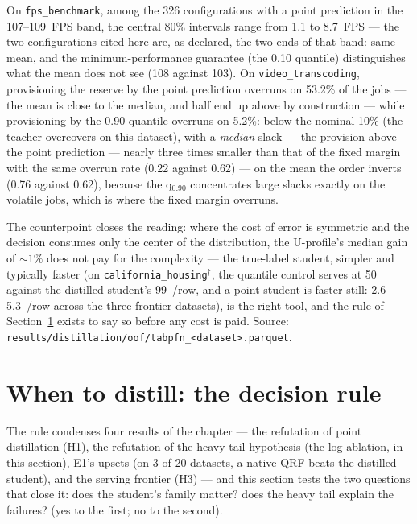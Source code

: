 On \texttt{fps\_\allowbreak benchmark}, among the 326 configurations
with a point prediction in the 107--109~FPS band, the central 80\%
intervals range from 1.1 to 8.7~FPS --- the two configurations cited here are,
as declared, the two ends of that band: same mean, and the
minimum-performance guarantee (the 0.10 quantile) distinguishes what
the mean does not see (108 against 103). On
\texttt{video\_\allowbreak transcoding}, provisioning the reserve by
the point prediction overruns on 53.2\% of the jobs --- the mean is
close to the median, and half end up above by construction ---
while provisioning by the 0.90 quantile overruns on 5.2\%: below
the nominal 10\% (the teacher overcovers on this dataset), with a
\emph{median} slack --- the provision above the point prediction ---
nearly three times smaller than that of the
fixed margin with the same overrun rate (0.22 against 0.62) --- on
the
mean the order inverts (0.76 against 0.62), because the q$_{0.90}$
concentrates large slacks exactly on the volatile jobs, which is
where the fixed margin overruns.

The counterpoint closes the reading: where the cost of error is
symmetric and the decision consumes only the center of the
distribution, the U-profile's median gain of ${\sim}1\%$ does not
pay for the complexity --- the true-label student, simpler and
typically faster (on
\texttt{california\_\allowbreak housing}$^\dagger$, the quantile
control serves at 50 against the distilled student's 99~\us/row,
and a point student is faster still: 2.6--5.3~\us/row across the
three frontier datasets), is the
right tool, and the rule of
Section~\ref{sec:destil-regra} exists to say so before any cost is
paid. Source:
\texttt{results/\allowbreak distillation/\allowbreak oof/\allowbreak tabpfn\_\allowbreak <dataset>.parquet}.

\section{When to distill: the decision rule}
\label{sec:destil-regra}

The rule condenses four results of the chapter --- the refutation
of point distillation (H1), the refutation of the heavy-tail
hypothesis (the log ablation, in this section), E1's upsets (on 3 of 20
datasets, a native QRF beats the distilled student), and the serving
frontier (H3) --- and this section tests the two questions that
close it:
does the student's family matter? does the heavy tail
explain the failures? (yes to the first; no to the second).

